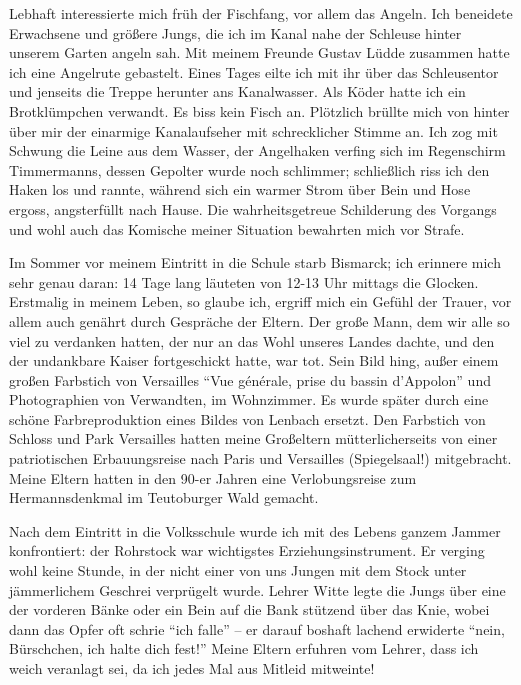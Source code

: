 Lebhaft interessierte mich früh der Fischfang, vor allem das Angeln. Ich beneidete Erwachsene und größere Jungs, die ich im Kanal nahe der Schleuse hinter unserem Garten angeln sah. Mit meinem Freunde Gustav Lüdde zusammen hatte ich eine Angelrute gebastelt. Eines Tages eilte ich mit ihr über das Schleusentor und jenseits die Treppe herunter ans Kanalwasser. Als Köder hatte ich ein Brotklümpchen verwandt. Es biss kein Fisch an. Plötzlich brüllte mich von hinter über mir der einarmige Kanalaufseher mit schrecklicher Stimme an. Ich zog mit Schwung die Leine aus dem Wasser, der Angelhaken verfing sich im Regenschirm Timmermanns, dessen Gepolter wurde noch schlimmer; schließlich riss ich den Haken los und rannte, während sich ein warmer Strom über Bein und Hose ergoss, angsterfüllt nach Hause. Die wahrheitsgetreue Schilderung des Vorgangs und wohl auch das Komische meiner Situation bewahrten mich vor Strafe.

Im Sommer vor meinem Eintritt in die Schule starb Bismarck; ich erinnere mich sehr genau daran: 14 Tage lang läuteten von 12-13 Uhr mittags die Glocken. Erstmalig in meinem Leben, so glaube ich, ergriff mich ein Gefühl der Trauer, vor allem auch genährt durch Gespräche der Eltern. Der große Mann, dem wir alle so viel zu verdanken hatten, der nur an das Wohl unseres Landes dachte, und den der undankbare Kaiser fortgeschickt hatte, war tot. Sein Bild hing, außer einem großen Farbstich von Versailles \enquote{Vue générale, prise du bassin d'Appolon} und Photographien von Verwandten, im Wohnzimmer. Es wurde später durch eine schöne Farbreproduktion eines Bildes von Lenbach ersetzt. Den Farbstich von Schloss und Park Versailles hatten meine Großeltern mütterlicherseits von einer patriotischen Erbauungsreise nach Paris und Versailles (Spiegelsaal!) mitgebracht. Meine Eltern hatten in den 90-er Jahren eine Verlobungsreise zum Hermannsdenkmal im Teutoburger Wald gemacht.

Nach dem Eintritt in die Volksschule wurde ich mit des Lebens ganzem Jammer konfrontiert: der Rohrstock war wichtigstes Erziehungsinstrument. Er verging wohl keine Stunde, in der nicht einer von uns Jungen mit dem Stock unter jämmerlichem Geschrei verprügelt wurde. Lehrer Witte legte die Jungs über eine der vorderen Bänke oder ein Bein auf die Bank stützend über das Knie, wobei dann das Opfer oft schrie \enquote{ich falle} -- er darauf boshaft lachend erwiderte \enquote{nein, Bürschchen, ich halte dich fest!} Meine Eltern erfuhren vom Lehrer, dass ich weich veranlagt sei, da ich jedes Mal aus Mitleid mitweinte!

